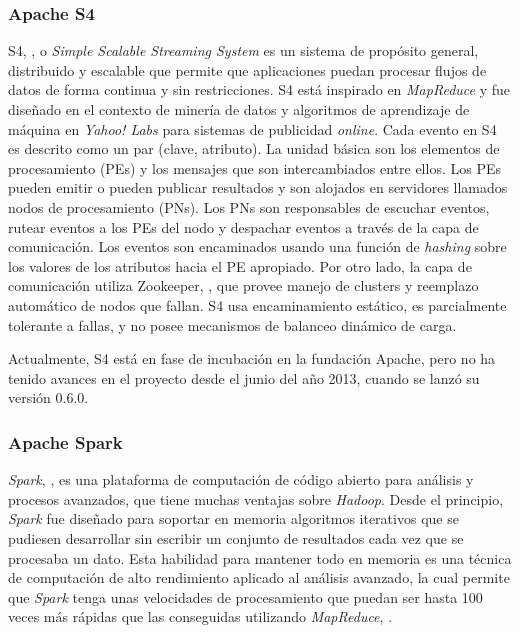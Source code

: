 \subsubsection*{Apache S4}
\label{arte:SPS:s4}
					
S4, \citep{NeumeyerS4}, o \textit{Simple Scalable Streaming System} es un sistema de propósito general, distribuido y escalable que permite que aplicaciones puedan procesar flujos de datos de forma continua y sin restricciones. S4 está inspirado en \textit{MapReduce} y fue diseñado en el contexto de minería de datos y algoritmos de aprendizaje de máquina en \textit{Yahoo! Labs} para sistemas de publicidad \textit{online}. Cada evento en S4 es descrito como un par (clave, atributo). La unidad básica son los elementos de procesamiento (PEs) y los mensajes que son intercambiados entre ellos. Los PEs pueden emitir o pueden publicar resultados y son alojados en servidores llamados nodos de procesamiento (PNs). Los PNs son responsables de escuchar eventos, rutear eventos a los PEs del nodo y despachar eventos a través de la capa de comunicación. Los eventos son encaminados usando una función de \textit{hashing} sobre los valores de los atributos hacia el PE apropiado. Por otro lado, la capa de comunicación utiliza Zookeeper, \citep{HuntZookeeper}, que provee manejo de clusters y reemplazo automático de nodos que fallan. S4 usa encaminamiento estático, es parcialmente tolerante a fallas, y no posee mecanismos de balanceo dinámico de carga.
					
Actualmente, S4 está en fase de incubación en la fundación Apache, pero no ha tenido avances en el proyecto desde el junio del año 2013, cuando se lanzó su versión 0.6.0.

\subsubsection*{Apache Spark}
\label{arte:SPS:spark}

\textit{Spark}, \citep{SparkOnline}, es una plataforma de computación de código abierto para análisis y procesos avanzados, que tiene muchas ventajas sobre \textit{Hadoop}. Desde el principio, \textit{Spark} fue diseñado para soportar en memoria algoritmos iterativos que se pudiesen desarrollar sin escribir un conjunto de resultados cada vez que se procesaba un dato. Esta habilidad para mantener todo en memoria es una técnica de computación de alto rendimiento aplicado al análisis avanzado, la cual permite que \textit{Spark} tenga unas velocidades de procesamiento que puedan ser hasta 100 veces más rápidas que las conseguidas utilizando \textit{MapReduce}, \citep{Spark}.

